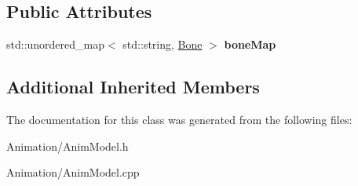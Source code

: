 \subsection*{Public Attributes}
\begin{DoxyCompactItemize}
\item 
\mbox{\label{classAnimModel_aceed3b69ed40893d926333b1843e837e}} 
std\+::unordered\+\_\+map$<$ std\+::string, \hyperlink{structBone}{Bone} $>$ {\bfseries bone\+Map}
\end{DoxyCompactItemize}
\subsection*{Additional Inherited Members}


The documentation for this class was generated from the following files\+:\begin{DoxyCompactItemize}
\item 
Animation/Anim\+Model.\+h\item 
Animation/Anim\+Model.\+cpp\end{DoxyCompactItemize}
